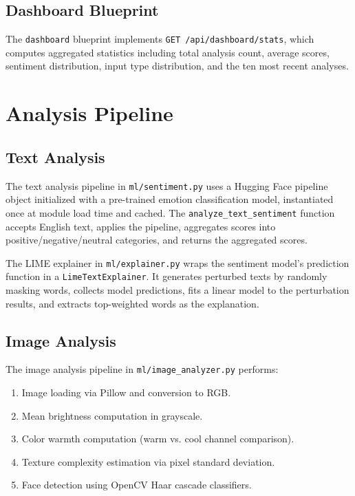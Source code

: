 \documentclass[12pt, a4paper]{report}
\begin{document}
\subsection{Dashboard Blueprint}

The \texttt{dashboard} blueprint implements \texttt{GET /api/dashboard/stats}, which computes aggregated statistics including total analysis count, average scores, sentiment distribution, input type distribution, and the ten most recent analyses.

\section{Analysis Pipeline}

\subsection{Text Analysis}

The text analysis pipeline in \texttt{ml/sentiment.py} uses a Hugging Face pipeline object initialized with a pre-trained emotion classification model, instantiated once at module load time and cached. The \texttt{analyze\_text\_sentiment} function accepts English text, applies the pipeline, aggregates scores into positive/negative/neutral categories, and returns the aggregated scores.

The LIME explainer in \texttt{ml/explainer.py} wraps the sentiment model's prediction function in a \texttt{LimeTextExplainer}. It generates perturbed texts by randomly masking words, collects model predictions, fits a linear model to the perturbation results, and extracts top-weighted words as the explanation.

\subsection{Image Analysis}

The image analysis pipeline in \texttt{ml/image\_analyzer.py} performs:

\begin{enumerate}[noitemsep, leftmargin=2em]
    \item Image loading via Pillow and conversion to RGB.
    \item Mean brightness computation in grayscale.
    \item Color warmth computation (warm vs. cool channel comparison).
    \item Texture complexity estimation via pixel standard deviation.
    \item Face detection using OpenCV Haar cascade classifiers.
\end{enumerate}
\end{document}
